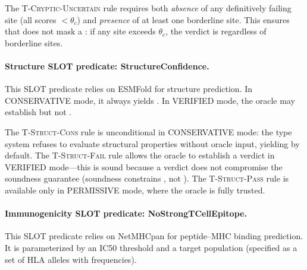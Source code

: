 \noindent The \textsc{T-Cryptic-Uncertain} rule requires both
\emph{absence} of any definitively failing site (all scores $<
\theta_c$) and \emph{presence} of at least one borderline site.
This ensures that \UNCERTAIN{} does not mask a \FAIL: if any site
exceeds $\theta_c$, the verdict is \FAIL{} regardless of borderline
sites.

\paragraph{Structure SLOT predicate: StructureConfidence.}
This SLOT predicate relies on ESMFold for structure prediction.
In CONSERVATIVE mode, it always yields \UNCERTAIN{}.
In VERIFIED mode, the oracle may establish \FAIL{} but not \PASS.


\noindent The \textsc{T-Struct-Cons} rule is unconditional in
CONSERVATIVE mode: the type system refuses to evaluate structural
properties without oracle input, yielding \UNCERTAIN{} by default.
The \textsc{T-Struct-Fail} rule allows the oracle to establish a
\FAIL{} verdict in VERIFIED mode---this is sound because a \FAIL{}
verdict does not compromise the soundness guarantee (soundness
constrains \PASS{}, not \FAIL).
The \textsc{T-Struct-Pass} rule is available only in PERMISSIVE mode,
where the oracle is fully trusted.

\paragraph{Immunogenicity SLOT predicate: NoStrongTCellEpitope.}
This SLOT predicate relies on NetMHCpan for peptide--MHC binding
prediction.
It is parameterized by an IC50 threshold and a target population
(specified as a set of HLA alleles with frequencies).

